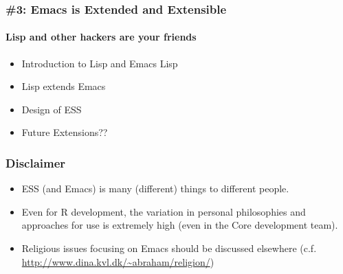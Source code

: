 \documentclass{beamer}
\begin{document}
\begin{frame}
  \frametitle{\#3: Emacs is Extended and Extensible}
  \framesubtitle{Lisp and other hackers are your friends}
  \begin{itemize}
  \item Introduction to Lisp and Emacs Lisp
  \item Lisp extends Emacs
  \item Design of ESS
  \item Future Extensions??
  \end{itemize}
\end{frame}


\begin{frame}
  \frametitle{Disclaimer}
  \begin{itemize}
  \item ESS (and Emacs) is many (different) things to different
    people.
  \item Even for R development, the variation in personal philosophies
    and approaches for use is extremely high (even in the Core
    development team).
  \item Religious issues focusing on Emacs should be discussed elsewhere 
    (c.f. \url{http://www.dina.kvl.dk/~abraham/religion/})
  \end{itemize}
\end{frame}
\end{document}
